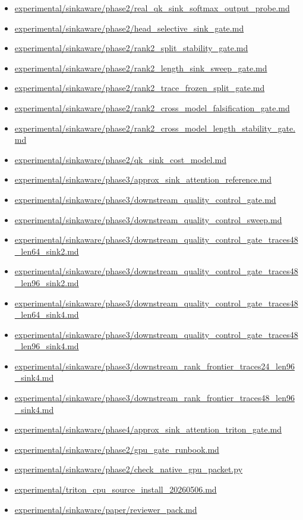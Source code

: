 \documentclass{article}
\begin{document}
\begin{itemize}
\item \url{experimental/sinkaware/phase2/real_qk_sink_softmax_output_probe.md}
\item \url{experimental/sinkaware/phase2/head_selective_sink_gate.md}
\item \url{experimental/sinkaware/phase2/rank2_split_stability_gate.md}
\item \url{experimental/sinkaware/phase2/rank2_length_sink_sweep_gate.md}
\item \url{experimental/sinkaware/phase2/rank2_trace_frozen_split_gate.md}
\item \url{experimental/sinkaware/phase2/rank2_cross_model_falsification_gate.md}
\item \url{experimental/sinkaware/phase2/rank2_cross_model_length_stability_gate.md}
\item \url{experimental/sinkaware/phase2/qk_sink_cost_model.md}
\item \url{experimental/sinkaware/phase3/approx_sink_attention_reference.md}
\item \url{experimental/sinkaware/phase3/downstream_quality_control_gate.md}
\item \url{experimental/sinkaware/phase3/downstream_quality_control_sweep.md}
\item \url{experimental/sinkaware/phase3/downstream_quality_control_gate_traces48_len64_sink2.md}
\item \url{experimental/sinkaware/phase3/downstream_quality_control_gate_traces48_len96_sink2.md}
\item \url{experimental/sinkaware/phase3/downstream_quality_control_gate_traces48_len64_sink4.md}
\item \url{experimental/sinkaware/phase3/downstream_quality_control_gate_traces48_len96_sink4.md}
\item \url{experimental/sinkaware/phase3/downstream_rank_frontier_traces24_len96_sink4.md}
\item \url{experimental/sinkaware/phase3/downstream_rank_frontier_traces48_len96_sink4.md}
\item \url{experimental/sinkaware/phase4/approx_sink_attention_triton_gate.md}
\item \url{experimental/sinkaware/phase2/gpu_gate_runbook.md}
\item \url{experimental/sinkaware/phase2/check_native_gpu_packet.py}
\item \url{experimental/triton_cpu_source_install_20260506.md}
\item \url{experimental/sinkaware/paper/reviewer_pack.md}
\end{itemize}
\end{document}
